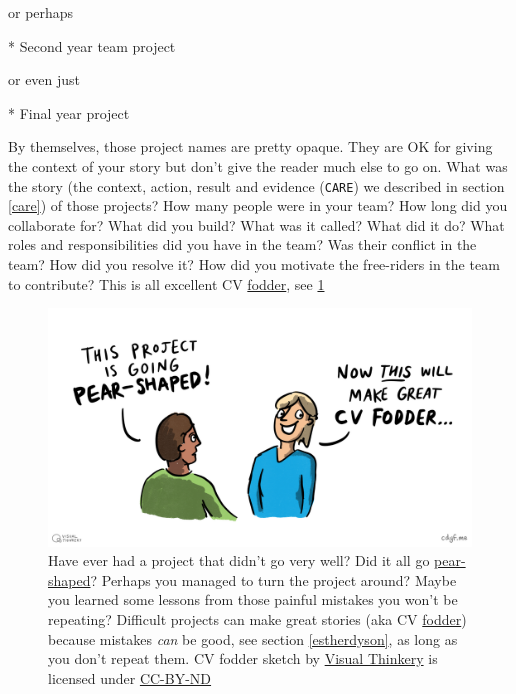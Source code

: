 \documentclass[
]{book}
\newenvironment{Shaded}{\begin{snugshade}}{\end{snugshade}}
\newcommand{\NormalTok}[1]{#1}
\newcommand{\SpecialStringTok}[1]{\textcolor[rgb]{0.31,0.60,0.02}{#1}}
\begin{document}
or perhaps

\begin{Shaded}
\begin{Highlighting}[]
\SpecialStringTok{* }\NormalTok{Second year team project}
\end{Highlighting}
\end{Shaded}

or even just

\begin{Shaded}
\begin{Highlighting}[]
\SpecialStringTok{* }\NormalTok{Final year project}
\end{Highlighting}
\end{Shaded}

By themselves, those project names are pretty opaque. They are OK for giving the context of your story but don't give the reader much else to go on. What was the story (the context, action, result and evidence (\texttt{CARE}) we described in section \ref{care}) of those projects? How many people were in your team? How long did you collaborate for? What did you build? What was it called? What did it do? What roles and responsibilities did you have in the team? Was their conflict in the team? How did you resolve it? How did you motivate the free-riders in the team to contribute? This is all excellent CV \href{https://en.wikipedia.org/wiki/Fodder}{fodder}, see \ref{fig:cvfodder-fig}

\begin{figure}

{\centering \includegraphics[width=0.98\linewidth]{images/CV Fodder} 

}

\caption{Have ever had a project that didn't go very well? Did it all go \href{https://en.wikipedia.org/wiki/Pear-shaped}{pear-shaped}? Perhaps you managed to turn the project around? Maybe you learned some lessons from those painful mistakes you won't be repeating? Difficult projects can make great stories (aka CV \href{https://en.wikipedia.org/wiki/Fodder}{fodder}) because mistakes \emph{can} be good, see section \ref{estherdyson}, as long as you don't repeat them. CV fodder sketch by \href{https://visualthinkery.com/}{Visual Thinkery} is licensed under \href{https://creativecommons.org/licenses/by-nd/4.0/}{CC-BY-ND}}\label{fig:cvfodder-fig}
\end{figure}
\end{document}
